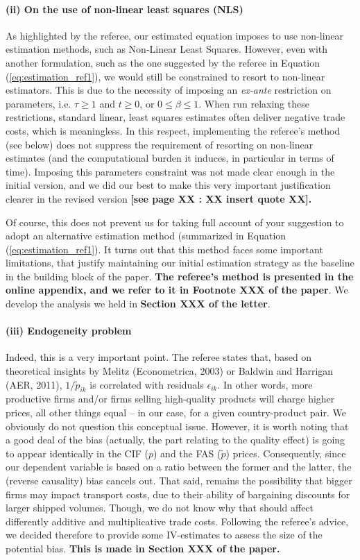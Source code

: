 \documentclass[a4paper,12pt]{article}
\begin{document}
\paragraph{(ii) On the use of non-linear least squares (NLS)}
As highlighted by the referee, our estimated equation imposes to use non-linear estimation methods, such as Non-Linear Least Squares. However, even with another formulation, such as the one suggested by the referee in Equation (\ref{eq:estimation_ref1}), we would still be constrained to resort to non-linear estimators. This is due to the necessity of imposing an \textit{ex-ante} restriction on parameters, i.e. $\tau \geq 1$ and $t \geq 0$, or $0 \leq  \beta \leq 1$. When run relaxing these restrictions, standard linear, least squares estimates often deliver negative trade costs, which is meaningless. In this respect, implementing the referee's method (see below) does not suppress the requirement of resorting on non-linear estimates (and the computational burden it induces, in particular in terms of time). Imposing this parameters constraint was not made clear enough in the initial version, and we did our best to make this very important justification clearer in the revised version \textbf{[see page XX : XX insert quote XX].} \smallskip


Of course, this does not prevent us for taking full account of your suggestion to adopt an alternative estimation method (summarized in Equation (\ref{eq:estimation_ref1}). It turns out that this method faces some important limitations, that justify maintaining our initial estimation strategy as the baseline in the building block of the paper. \textbf{The referee's method is presented in the online appendix, and we refer to it in Footnote XXX of the paper}. We develop the analysis we held in \textbf{Section XXX of the letter}.


\paragraph{(iii) Endogeneity problem}

Indeed, this is a very important point. The referee states that, based on theoretical insights by Melitz (Econometrica, 2003) or Baldwin and Harrigan (AER, 2011), $1/\tilde{p}_{ik}$ is correlated with residuals $\epsilon_{ik}$. In other words, more productive firms and/or firms selling high-quality products will charge higher prices, all other things equal – in our case, for a given country-product pair. We obviously do not question this conceptual issue. However, it is worth noting that a good deal of the bias (actually, the part relating to the quality effect) is going to appear identically in the CIF ($p$) and the FAS ($\tilde{p}$) prices. Consequently, since our dependent variable is based on a ratio between the former and the latter, the (reverse causality) bias cancels out. That said, remains the possibility that bigger firms may impact transport costs, due to their ability of bargaining discounts for larger shipped volumes. Though, we do not know why that should affect differently additive and multiplicative trade costs. Following the referee's advice, we decided therefore to provide some IV-estimates to assess the size of the potential bias. \textbf{This is made in Section XXX of the paper.}
\end{document}
